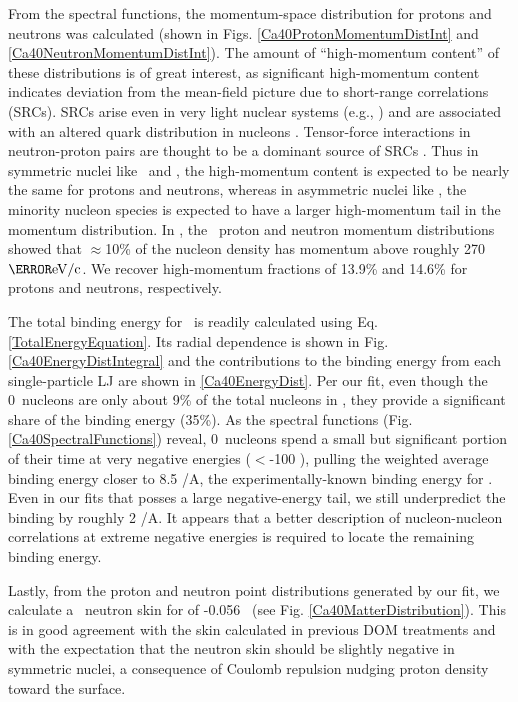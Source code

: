 From the spectral functions, the momentum-space distribution for protons and neutrons was
calculated (shown in Figs. \ref{Ca40ProtonMomentumDistInt} and
\ref{Ca40NeutronMomentumDistInt}). 
The amount of ``high-momentum content'' of
these distributions is of great interest, as significant high-momentum content 
indicates deviation from the mean-field picture due to short-range correlations (SRCs). SRCs arise 
even in very light nuclear systems (e.g., \heFour)
and are associated with an altered quark distribution in nucleons 
\cite{Hen2012, Arrington2012, CLAS2019}.
Tensor-force interactions in neutron-proton pairs are thought to be a dominant source of 
SRCs \cite{Subedi2008}. Thus in symmetric nuclei like \cTwelve\ and \caForty, the
high-momentum content is expected to be nearly the same for protons and neutrons, whereas in
asymmetric nuclei like \pbEight, the minority nucleon species is expected to have a larger
high-momentum tail in the momentum distribution. In \cite{Rohe2004}, the \cTwelve\ proton and
neutron momentum distributions showed that $\approx$10\% of the nucleon density
has momentum above roughly 270 $\mega\electronvolt/\text{c}$.
We recover high-momentum fractions of 13.9\% and 14.6\%
for protons and neutrons, respectively.

The total binding energy for \caForty\ is readily calculated using Eq.
\ref{TotalEnergyEquation}. Its radial dependence is shown in Fig.
\ref{Ca40EnergyDistIntegral} and the
contributions to the binding energy from each single-particle LJ are shown in
\ref{Ca40EnergyDist}. Per our fit, even though the 0\sOne\ nucleons are
only about 9\% of the total nucleons in \caForty, they provide a significant
share of the binding
energy (35\%). As the spectral
functions (Fig. \ref{Ca40SpectralFunctions}) reveal, 0\sOne\ nucleons spend a small but significant portion of their time 
at very negative energies ($<$-100 \mega\electronvolt), pulling the weighted average binding energy 
closer to 8.5 \mega\electronvolt/A, the experimentally-known binding energy
for \caForty. Even in our fits that posses a large negative-energy tail, we
still underpredict the binding by roughly 2 \mega\electronvolt/A. It appears
that a better description of nucleon-nucleon correlations at extreme
negative energies is required to locate the remaining binding energy.

Lastly, from the proton and neutron point distributions generated by our fit, we calculate a
\caForty\ neutron skin for of -0.056 \femto\meter\ (see Fig. \ref{Ca40MatterDistribution}). 
This is in good agreement with the skin calculated in previous DOM treatments
\cite{MahzoonPhDThesis} and with the expectation that the neutron skin should be slightly negative in
symmetric nuclei, a consequence of Coulomb repulsion nudging proton density toward the surface.

